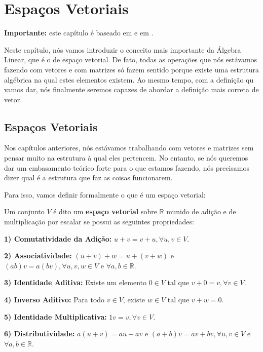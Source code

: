 \chapter{Espaços Vetoriais}
\label{cap:espaços-vetoriais}

\textbf{Importante:} este capítulo é baseado em \cite{slide4doyuri} e em \cite{axler2026}.

Neste capítulo, nós vamos introduzir o conceito mais importante da Álgebra Linear, que é o de espaço vetorial. De fato, todas as operações que nós estávamos fazendo com vetores e com matrizes só fazem sentido porque existe uma estrutura algébrica na qual estes elementos existem. Ao mesmo tempo, com a definição qu vamos dar, nós finalmente seremos capazes de abordar a definição mais correta de vetor.

\section{Espaços Vetoriais}

Nos capítulos anteriores, nós estávamos trabalhando com vetores e matrizes sem pensar muito na estrutura à qual eles pertencem. No entanto, se nós queremos dar um embasamento teórico forte para o que estamos fazendo, nós precisamos dizer qual é a estrutura que faz as coisas funcionarem.

Para isso, vamos definir formalmente o que é um espaço vetorial:

\begin{Definition}
	Um conjunto $V$ é dito um \textbf{espaço vetorial} sobre $\mathbb{R}$ munido de adição e de multiplicação por escalar se possui as seguintes propriedades:
	
	\textbf{1) Comutatividade da Adição:} $u + v = v + u, \forall u, v \in V$.
	
	\textbf{2) Associatividade:} $(u + v) + w = u + (v + w)$ e $(ab)v = a(bv), \forall u, v, w \in V$ e $\forall a, b \in\mathbb{R}$.
	
	\textbf{3) Identidade Aditiva:} Existe um elemento $0\in V$ tal que $v + 0 = v, \forall v \in V$.
	
	\textbf{4) Inverso Aditivo:} Para todo $v\in V$, existe $w\in V$ tal que $v + w = 0$.
	
	\textbf{5) Identidade Multiplicativa:} $1v = v, \forall v\in V$.
	
	\textbf{6) Distributividade:} $a(u + v) = au + av$ e $(a + b)v = av + bv, \forall u, v \in V$ e $\forall a, b \in \mathbb{R}$.
\end{Definition}

